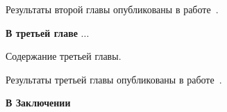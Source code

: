 \documentclass[14pt,autoref,href,facsimile
]{disser}
\begin{document}
Результаты второй главы опубликованы в
работе~.

\textbf{В третьей главе} ...

Содержание третьей главы.

Результаты третьей главы опубликованы в
работе~.

\textbf{В Заключении}

\renewcommand\bibsection{\nsection{Список публикаций}}

\def\BibPrefix{A}

\renewcommand\bibsection{\nsection{Цитированная литература}}

\def\BibPrefix{}


\end{document}
